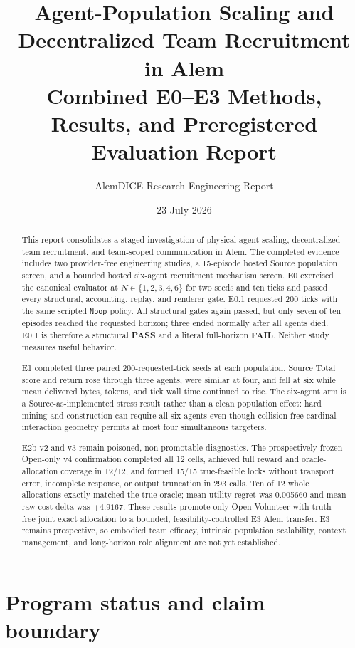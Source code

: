 \documentclass[11pt]{article}
\title{Agent-Population Scaling and Decentralized Team Recruitment in Alem\\
\large Combined E0--E3 Methods, Results, and Preregistered Evaluation Report}
\author{AlemDICE Research Engineering Report}
\date{23 July 2026}
\newcommand{\pass}{\textcolor{passgreen}{\textbf{PASS}}}
\newcommand{\fail}{\textcolor{failred}{\textbf{FAIL}}}
\newcommand{\code}[1]{\texttt{#1}}
\begin{document}
\maketitle

\begin{abstract}
This report consolidates a staged investigation of physical-agent scaling,
decentralized team recruitment, and team-scoped communication in Alem.
The completed evidence includes two provider-free engineering studies, a
15-episode hosted Source population screen, and a bounded hosted six-agent
recruitment mechanism screen.
E0 exercised the canonical evaluator at
$N\in\{1,2,3,4,6\}$ for two seeds and ten ticks and passed every structural,
accounting, replay, and renderer gate.  E0.1 requested 200 ticks with the same
scripted \code{Noop} policy.  All structural gates again passed, but only seven
of ten episodes reached the requested horizon; three ended normally after all
agents died.  E0.1 is therefore a structural \pass{} and a literal
full-horizon \fail{}.  Neither study measures useful behavior.

E1 completed three paired 200-requested-tick seeds at each population.  Source
Total score and return rose through three agents, were similar at four, and
fell at six while mean delivered bytes, tokens, and tick wall time continued
to rise.  The six-agent arm is a Source-as-implemented stress result rather
than a clean population effect: hard mining and construction can require all
six agents even though collision-free cardinal interaction geometry permits at
most four simultaneous targeters.

E2b v2 and v3 remain poisoned, non-promotable diagnostics.  The prospectively
frozen Open-only v4 confirmation completed all 12 cells, achieved full reward
and oracle-allocation coverage in 12/12, and formed 15/15 true-feasible locks
without transport error, incomplete response, or output truncation in 293
calls.  Ten of 12 whole allocations exactly matched the true oracle; mean
utility regret was 0.005660 and mean raw-cost delta was $+4.9167$.  These
results promote only Open Volunteer with truth-free joint exact allocation to
a bounded, feasibility-controlled E3 Alem transfer.  E3 remains prospective,
so embodied team efficacy, intrinsic population scalability, context
management, and long-horizon role alignment are not yet established.
\end{abstract}

\section{Program status and claim boundary}
\end{document}
